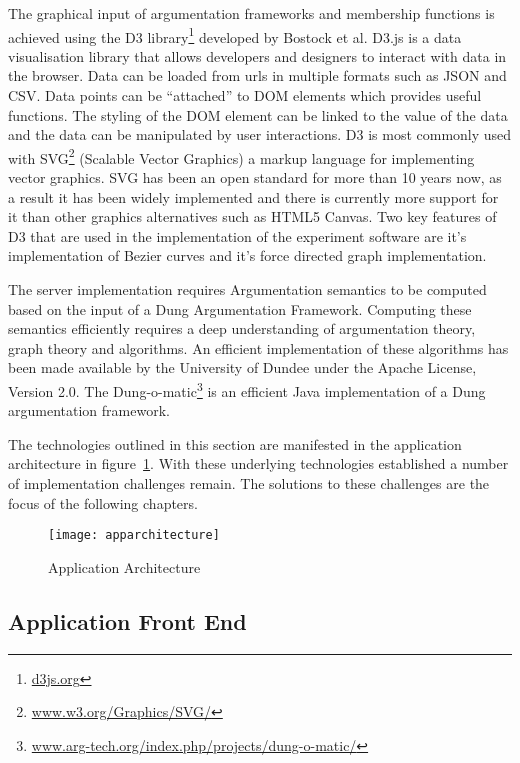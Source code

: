 The graphical input of argumentation frameworks and membership functions is achieved using the  D3 library\footnote{\url{d3js.org}} developed by Bostock et al.\cite{2011-d3} D3.js is a data visualisation library that allows developers and designers to interact with data in the browser. Data can be loaded from urls in multiple formats such as JSON and CSV. Data points can be ``attached'' to DOM elements which provides useful functions. The styling of the DOM element can be linked to the value of the data and the data can be manipulated by user interactions. D3 is most commonly used with SVG\footnote{\url{www.w3.org/Graphics/SVG/}} (Scalable Vector Graphics) a markup language for implementing vector graphics. SVG has been an open standard for more than 10 years now, as a result it has been widely implemented and there is currently more support for it than other graphics alternatives such as HTML5 Canvas. Two key features of D3 that are used in the implementation of the experiment software are it's implementation of Bezier curves and it's force directed graph implementation.

The server implementation requires Argumentation semantics to be computed based on the input of a Dung Argumentation Framework. Computing these semantics efficiently requires a deep understanding of argumentation theory, graph theory and algorithms. An efficient implementation of these algorithms has been made available by the University of Dundee under the Apache License, Version 2.0. The Dung-o-matic\footnote{\url{www.arg-tech.org/index.php/projects/dung-o-matic/}} is an efficient Java implementation of a Dung argumentation framework. 

The technologies outlined in this section are manifested in the application architecture in figure~\ref{fig:AppArch}. With these underlying technologies established a number of implementation challenges remain. The solutions to these challenges are the focus of the following chapters.

\begin{figure}[h]
    \centering
    \texttt{[image: apparchitecture]}
    \caption{Application Architecture}
    \label{fig:AppArch}
\end{figure}

\subsection{Application Front End}

